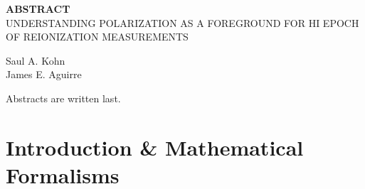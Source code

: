 \documentclass[12pt,twoside,openany]{book}
\newcommand{\singlespaced}{\renewcommand{\baselinestretch}{1}\normalfont}
\newcommand{\halfspaced}{\renewcommand{\baselinestretch}{1.5}\normalfont}
\newcommand{\tita}{UNDERSTANDING POLARIZATION AS A FOREGROUND FOR HI EPOCH OF REIONIZATION MEASUREMENTS}
\begin{document}
\newpage
\vspace*{.15 in}
\begin{center}
{\bf ABSTRACT}\\
\tita \\
\parskip=0.2in


Saul A. Kohn\\
James E. Aguirre
\end{center}
\noindent
Abstracts are written last.

\vspace*{\fill}

\newpage

\singlespaced
\tableofcontents


\newpage
{}
{}
\listoftables

\newpage
{}
\listoffigures


\halfspaced
\setlength{\parindent}{0.25in}



\mainmatter
\part{Introduction \& Mathematical Formalisms}
%
%
%
%
%
%
%
%

%
%
\end{document}

